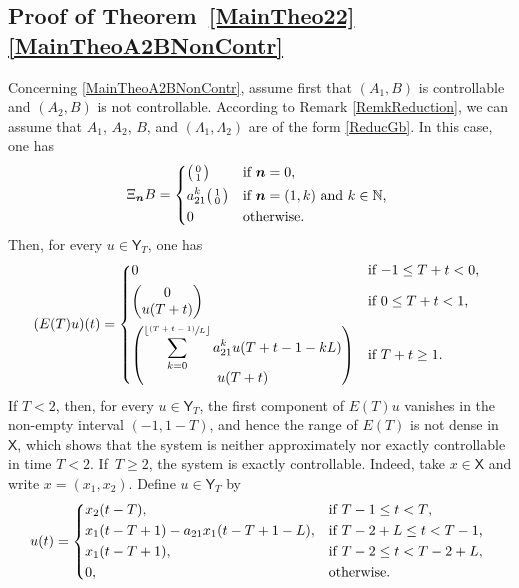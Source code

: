 \documentclass[10pt]{amsart}
\newcommand{\psfrac}[2]{\sfrac{(#1)}{#2}}
\newcommand{\bn}{\boldsymbol{n}}
\newenvironment{smallpmatrix}{\big(\begin{smallmatrix}}{\end{smallmatrix}\big)}
\theoremstyle{plain}
\theoremstyle{definition}
\newcommand{\floor}[1]{\left\lfloor #1 \right\rfloor}
\begin{document}
\subsection{Proof of Theorem~\ref{MainTheo22}\eqref{MainTheoA2BNonContr}}

Concerning \eqref{MainTheoA2BNonContr}, assume first that $(A_1, B)$ is controllable and $(A_2, B)$ is not controllable. According to Remark \ref{RemkReduction}, we can assume that $A_1$, $A_2$, $B$, and $(\Lambda_1, \Lambda_2)$ are of the form \eqref{ReducGb}. In this case, one has
\[
\Xi_{\bn} B =
\begin{dcases*}
\begin{smallpmatrix}0 \\ 1 \\\end{smallpmatrix} & if $\bn = 0$, \\
a_{21}^k \begin{smallpmatrix}1 \\ 0 \\\end{smallpmatrix} & if $\bn = (1, k)$ and $k \in \mathbb N$, \\
0 & otherwise.
\end{dcases*}
\]
Then, for every $u \in \mathsf Y_T$, one has
\begin{equation}
\label{ETu-NewCase}
(E(T) u)(t) =
\begin{dcases*}
0 & if $-1 \leq T + t < 0$, \\
\begin{pmatrix}0 \\ u(T + t)\end{pmatrix} & if $0 \leq T + t < 1$, \\
\begin{pmatrix} \displaystyle\sum_{k=0}^{\floor{\psfrac{T + t - 1}{L}}} a_{21}^k u(T + t - 1 - k L) \\ u(T + t)\end{pmatrix} & if $T + t \geq 1$.
\end{dcases*}
\end{equation}
If $T < 2$, then, for every $u \in \mathsf Y_T$, the first component of $E(T) u$ vanishes in the non-empty interval $(-1, 1-T)$, and hence the range of $E(T)$ is not dense in $\mathsf X$, which shows that the system is neither approximately nor exactly controllable in time $T < 2$. If~$T \geq 2$, the system is exactly controllable. Indeed, take $x \in \mathsf X$ and write $x = (x_1, x_2)$. Define $u \in \mathsf Y_T$ by
\[
u(t) =
\begin{dcases*}
x_2(t - T), & if $T - 1 \leq t < T$, \\
x_1(t - T + 1) - a_{21} x_1(t - T + 1 - L), & if $T - 2 + L \leq t < T - 1$, \\
x_1(t - T + 1), & if $T - 2 \leq t < T - 2 + L$, \\
0, & otherwise.
\end{dcases*}
\]
\end{document}
